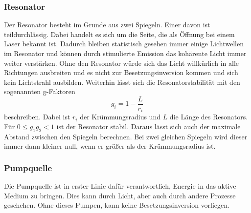 \subsubsection*{Resonator}
Der Resonator besteht im Grunde aus zwei Spiegeln.
Einer davon ist teildurchlässig. Dabei handelt es sich um die Seite, die als Öffnung bei einem Laser bekannt ist.
Dadurch bleiben statistisch gesehen immer einige Lichtwellen im Resonator und können durch stimulierte Emission das kohärente Licht immer weiter verstärken.
Ohne den Resonator würde sich das Licht willkürlich in alle Richtungen ausbreiten und es nicht zur Besetzungsinversion kommen und sich kein Lichtstrahl ausbilden.
Weiterhin lässt sich die Resonatorstabilität mit den sogenannten g-Faktoren 
\begin{equation} \label{eq:gfaktor}
    g_i = 1 - \frac{L}{r_i}
\end{equation}
beschreiben. Dabei ist $r_i$ der Krümmungsradius und $L$ die Länge des Resonators.
Für $0 \leq g_1 g_2 < 1$ ist der Resonator stabil.
Daraus lässt sich auch der maximale Abstand zwischen den Spiegeln berechnen.
Bei zwei gleichen Spiegeln wird dieser immer dann kleiner null, wenn er größer als der Krümmungsradius ist.


\subsubsection*{Pumpquelle}
Die Pumpquelle ist in erster Linie dafür verantwortlich, Energie in das aktive Medium zu bringen.
Dies kann durch Licht, aber auch durch andere Prozesse geschehen.
Ohne dieses Pumpen, kann keine Besetzungsinversion vorliegen.

